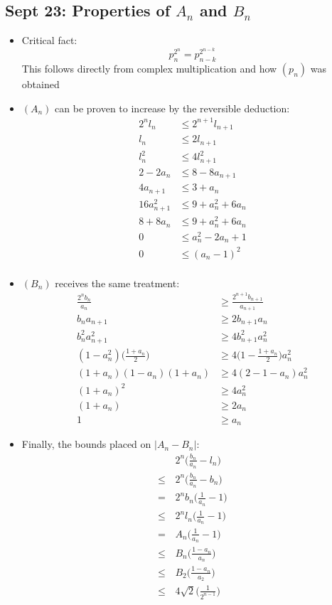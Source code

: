 \documentclass[10pt, oneside]{article}
\let\leq\leqslant
\let\geq\geqslant
\begin{document}
\subsection{Sept 23: Properties of $A_n$ and $B_n$}
\begin{itemize}
    \item Critical fact:
    \[p_n^{2^n} = p_{n-k}^{2^{n-k}}\]
    This follows directly from complex multiplication and how $(p_n)$ was obtained
    \item $(A_n)$ can be proven to increase by the reversible deduction:
    \begin{align*}
        2^n l_n & \leq 2^{n+1} l_{n+1}\\
        l_n & \leq 2 l_{n+1}\\
        l_n^2 & \leq 4 l_{n+1}^2\\
        2 - 2 a_n & \leq 8 - 8 a_{n+1}\\
        4 a_{n+1} & \leq 3 + a_n\\
        16 a_{n+1}^2 & \leq 9 + a_n^2 + 6 a_n\\
        8 + 8a_n & \leq 9 + a_n^2 + 6 a_n\\
        0 & \leq a_n^2 - 2 a_n + 1\\
        0 & \leq (a_n - 1)^2\\
    \end{align*}
    \item $(B_n)$ receives the same treatment:
    \begin{align*}
        \frac{2^n b_n}{a_n} & \geq \frac{2^{n+1} b_{n+1}}{a_{n+1}}\\
        b_n a_{n+1} & \geq 2 b_{n+1} a_n\\
        b_n^2 a_{n+1}^2 & \geq 4 b_{n+1}^2 a_n^2\\
        (1 - a_n^2) \Big( \frac{1 + a_n}{2} \Big) & \geq 4 \Big( 1 - \frac{1 + a_n}{2} \Big) a_n^2\\
        (1 + a_n)(1 - a_n)(1 + a_n) & \geq 4 (2 - 1 - a_n) a_n^2\\
        (1 + a_n)^2 & \geq 4 a_n^2\\
        (1 + a_n) & \geq 2 a_n\\
        1 & \geq a_n
    \end{align*}
    \item Finally, the bounds placed on $|A_n - B_n|$:
    \begin{align*}
        & 2^n \Big( \frac{b_n}{a_n} - l_n \Big)\\
        \leq \, & 2^n \Big( \frac{b_n}{a_n} - b_n \Big)\\
        = \, & 2^n b_n \Big( \frac{1}{a_n} - 1 \Big)\\
        \leq \, & 2^n l_n \Big( \frac{1}{a_n} - 1 \Big)\\
        = \, & A_n \Big( \frac{1}{a_n} - 1 \Big)\\
        \leq \, & B_n \Big( \frac{1 - a_n}{a_n} \Big)\\
        \leq \, & B_2 \Big( \frac{1 - a_n}{a_2} \Big)\\
        \leq \, & 4 \sqrt{2} \Big( \frac{1}{2^{n-1}} \Big)  
    \end{align*}
\end{itemize}
\end{document}
